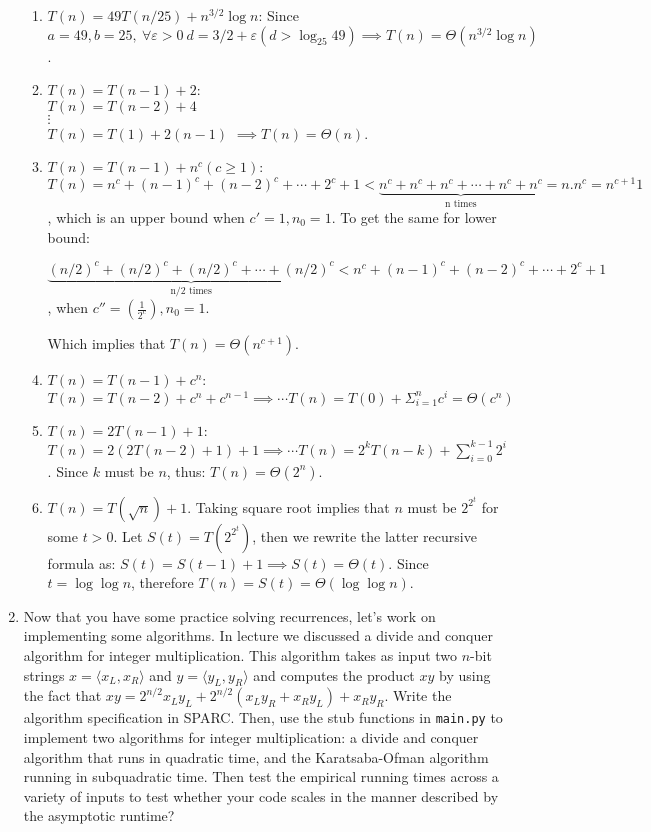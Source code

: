 \documentclass[12pt]{article}
\begin{document}
\begin{enumerate}
{\begin{enumerate}
    \item $T(n)=49T(n/25)+n^{3/2}\log n$: Since $a=49, b=25,~ \forall\varepsilon>0 ~d=3/2+\varepsilon (d> \log_25 49) \implies T(n)= \Theta(n^{3/2}{\log n})$.
   
    \item $T(n)=T(n-1)+2$: \\
    $T(n)=T(n-2)+4$ \\
    $\vdots $\\
    $T(n)=T(1)+2(n-1)$  $\implies T(n)=\Theta (n)$.
    
    \item $T(n)= T(n-1)+n^c (c\geq 1)$:  $T(n) = n^c+(n-1)^c+(n-2)^c+\cdots +2^c+1 < \underbrace{n^c+n^c+n^c+\cdots + n^c+n^c}_\text{n times}= n.n^c= n^{c+1}1$, which is an upper bound when $c'=1 , n_0=1$. To get the same for lower bound:
   
    $\underbrace{(n/2)^c+(n/2)^c+(n/2)^c+\cdots+ (n/2)^c}_\text{n/2 times} < n^c+(n-1)^c+(n-2)^c+\cdots +2^c+1$, when $c''=(\frac{1}{2^c}) , n_0=1$.
   
    Which implies that $T(n)= \Theta(n^{c+1})$.
    
    
    
    \item $T(n)= T(n-1)+ c^n$: $T(n)= T(n-2)+ c^n+c^{n-1} \implies \cdots T(n)= T(0) + \Sigma^n_{i=1} c^i= \Theta (c^n)$
   
    \item  $T(n)=2T(n-1)+1$: $T(n)=2(2T(n-2)+1)+1 \implies \cdots T(n)= 2^kT(n-k)+\sum_{i=0}^{k-1}2^i$. Since $k$ must be $n$, thus: $T(n)= \Theta(2^n)$.
    
    
    
    \item $T(n)=T(\sqrt{n})+1$. Taking square root implies that $n$ must be $2^{2^t}$ for some $t>0$. Let $S(t)= T(2^{2^t})$, then we rewrite the latter recursive formula as:
    $S(t)=S(t-1)+1 \implies S(t)=\Theta(t)$. Since $t=\log\log n$, therefore $T(n)=S(t)= \Theta(\log\log n)$.
\end{enumerate}
}

\item Now that you have some practice solving recurrences, let's work
  on implementing some algorithms. In lecture we discussed a divide and conquer algorithm for
    integer multiplication. This algorithm takes as input two $n$-bit
    strings $x = \langle x_L, x_R\rangle$ and
    $y=\langle y_L, y_R\rangle$ and computes the product $xy$ by using
    the fact that
    $xy = 2^{n/2}x_Ly_L + 2^{n/2}(x_Ly_R+x_Ry_L) + x_Ry_R.$ Write the
    algorithm specification in SPARC. Then, use the stub functions in
    \texttt{main.py} to implement two algorithms for integer
    multiplication: a divide and conquer algorithm that runs in
    quadratic time, and the Karatsaba-Ofman algorithm running in
    subquadratic time. Then test the empirical running times across a
    variety of inputs to test whether your code scales in the manner
    described by the asymptotic runtime?


\end{enumerate}
\end{document}
